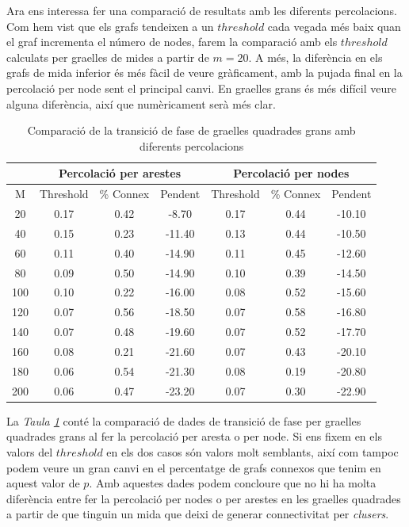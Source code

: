 \documentclass[a4paper]{article}
\begin{document}
	Ara ens interessa fer una comparació de resultats amb les diferents percolacions. Com hem vist que els grafs tendeixen a un $threshold$ cada vegada més baix quan el graf incrementa el número de nodes, farem la comparació amb els $threshold$ calculats per graelles de mides a partir de $m = 20$. A més, la diferència en els grafs de mida inferior és més fàcil de veure gràficament, amb la pujada final en la percolació per node sent el principal canvi. En graelles grans és més difícil veure alguna diferència, així que numèricament serà més clar. \\ 
	
	\begin{table} [H]
		\centering
		\begin{tabular}{|c|c|c|c|c|c|c|}
			\hline
			\rowcolor{gray!30}
			\multicolumn{1}{|c|}{} &\multicolumn{3}{|c|}{Percolació per arestes} & \multicolumn{3}{|c|}{Percolació per nodes} \\ \hline
			\rowcolor{gray!30}
			M & Threshold & \% Connex & Pendent & Threshold & \% Connex & Pendent \\ \hline
			20 & 0.17 & 0.42 & -8.70 & 0.17 & 0.44 & -10.10 \\ \hline
			40 & 0.15 & 0.23 & -11.40 & 0.13 & 0.44 & -10.50 \\ \hline
			60 & 0.11 & 0.40 & -14.90 & 0.11 & 0.45 & -12.60 \\ \hline
			80 & 0.09 & 0.50 & -14.90 & 0.10 & 0.39 & -14.50 \\ \hline
			100 & 0.10 & 0.22 & -16.00 & 0.08 & 0.52 & -15.60 \\ \hline
			120 & 0.07 & 0.56 & -18.50 & 0.07 & 0.58 & -16.80 \\ \hline
			140 & 0.07 & 0.48 & -19.60 & 0.07 & 0.52 & -17.70 \\ \hline
			160 & 0.08 & 0.21 & -21.60 & 0.07 & 0.43 & -20.10 \\ \hline
			180 & 0.06 & 0.54 & -21.30 & 0.08 & 0.19 & -20.80 \\ \hline
			200 & 0.06 & 0.47 & -23.20 & 0.07 & 0.30 & -22.90 \\ \hline
		\end{tabular}
		\caption{Comparació de la transició de fase de graelles quadrades grans amb diferents percolacions}
		\label{tab:comparacio_edges_nodes_square}
	\end{table}
	
	La \textit{Taula \ref{tab:comparacio_edges_nodes_square}} conté la comparació de dades de transició de fase per graelles quadrades grans al fer la percolació per aresta o per node. Si ens fixem en els valors del $threshold$ en els dos casos són valors molt semblants, així com tampoc podem veure un gran canvi en el percentatge de grafs connexos que tenim en aquest valor de $p$. Amb aquestes dades podem concloure que no hi ha molta diferència entre fer la percolació per nodes o per arestes en les graelles quadrades a partir de que tinguin un mida que deixi de generar connectivitat per \textit{clusers}.	
	
\end{document}

